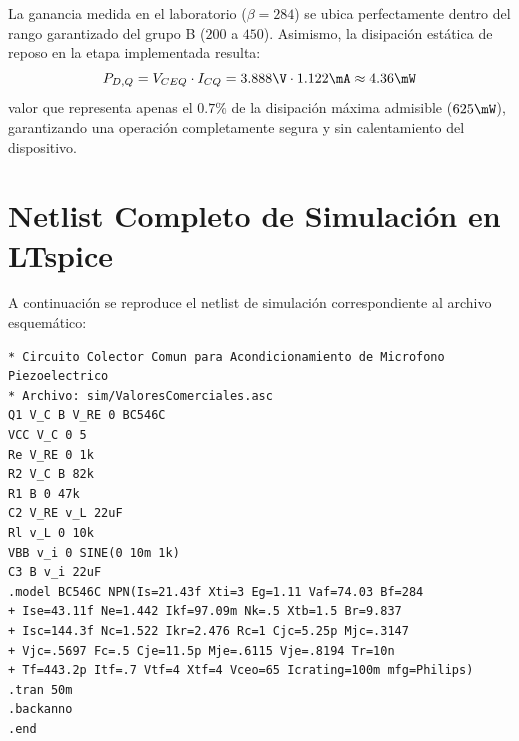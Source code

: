 \begin{table}[!ht]
  \centering
  \caption{Características eléctricas típicas del grupo de ganancia B del transistor BC546.}
  \label{tab:datasheet_caract_tp4}
\end{table}

La ganancia medida en el laboratorio ($\beta = 284$) se ubica perfectamente dentro del rango garantizado del grupo B
($200$ a $450$). Asimismo, la disipación estática de reposo en la etapa implementada resulta:
\begin{equation}
  P_{D,Q} = V_{CEQ} \cdot I_{CQ} = 3.888\V \cdot 1.122\mA \approx 4.36\mW
\end{equation}
valor que representa apenas el $0.7\%$ de la disipación máxima admisible ($625\mW$), garantizando una operación
completamente segura y sin calentamiento del dispositivo.

\section{Netlist Completo de Simulación en LTspice}

A continuación se reproduce el netlist de simulación correspondiente al archivo esquemático:

\begin{lstlisting}[style=ltspice, caption={Netlist de simulación para el circuito colector común en LTspice.}, label={list:netlist_colector_comun}]
* Circuito Colector Comun para Acondicionamiento de Microfono Piezoelectrico
* Archivo: sim/ValoresComerciales.asc
Q1 V_C B V_RE 0 BC546C
VCC V_C 0 5
Re V_RE 0 1k
R2 V_C B 82k
R1 B 0 47k
C2 V_RE v_L 22uF
Rl v_L 0 10k
VBB v_i 0 SINE(0 10m 1k)
C3 B v_i 22uF
.model BC546C NPN(Is=21.43f Xti=3 Eg=1.11 Vaf=74.03 Bf=284
+ Ise=43.11f Ne=1.442 Ikf=97.09m Nk=.5 Xtb=1.5 Br=9.837
+ Isc=144.3f Nc=1.522 Ikr=2.476 Rc=1 Cjc=5.25p Mjc=.3147
+ Vjc=.5697 Fc=.5 Cje=11.5p Mje=.6115 Vje=.8194 Tr=10n
+ Tf=443.2p Itf=.7 Vtf=4 Xtf=4 Vceo=65 Icrating=100m mfg=Philips)
.tran 50m
.backanno
.end
\end{lstlisting}

